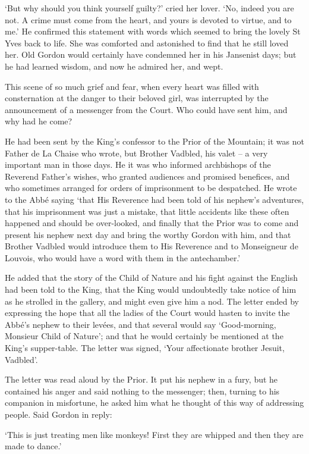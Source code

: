 \documentclass{article}
\begin{document}
\begin{center}
`But why should you think yourself guilty?' cried her lover. `No, indeed you are 
not. A crime must come from the heart, and yours is devoted to virtue, and to me.' 
He confirmed this statement with words which seemed to bring the lovely St Yves 
back to life. She was comforted and astonished to find that he still loved her. 
Old Gordon would certainly have condemned her in his Jansenist days; but he had 
learned wisdom, and now he admired her, and wept. 

This scene of so much grief and fear, when every heart was filled with consternation 
at the danger to their beloved girl, was interrupted by the announcement of a messenger 
from the Court. Who could have sent him, and why had he come? 

He had been sent by the King's confessor to the Prior of the Mountain; it was not 
Father de La Chaise who wrote, but Brother Vadbled, his valet – a very important 
man in those days. He it was who informed archbishops of the Reverend Father's 
wishes, who granted audiences and promised benefices, and who sometimes arranged 
for orders of imprisonment to be despatched. He wrote to the Abbé saying `that 
His Reverence had been told of his nephew's adventures, that his imprisonment was 
just a mistake, that little accidents like these often happened and should be over-looked, 
and finally that the Prior was to come and present his nephew next day and bring 
the worthy Gordon with him, and that Brother Vadbled would introduce them to His 
Reverence and to Monseigneur de Louvois, who would have a word with them in the 
antechamber.' 

He added that the story of the Child of Nature and his fight against the English 
had been told to the King, that the King would undoubtedly take notice of him as 
he strolled in the gallery, and might even give him a nod. The letter ended by 
expressing the hope that all the ladies of the Court would hasten to invite the 
Abbé's nephew to their levées, and that several would say `Good-morning, Monsieur 
Child of Nature'; and that he would certainly be mentioned at the King's supper-table. 
The letter was signed, `Your affectionate brother Jesuit, Vadbled'. 

The letter was read aloud by the Prior. It put his nephew in a fury, but he contained 
his anger and said nothing to the messenger; then, turning to his companion in 
misfortune, he asked him what he thought of this way of addressing people. Said 
Gordon in reply: 

`This is just treating men like monkeys! First they are whipped and then they are 
made to dance.' 


\end{center}
\end{document}
